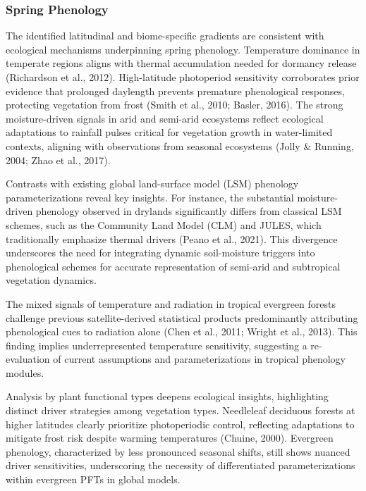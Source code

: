 \documentclass[pdflatex,sn-mathphys-num]{sn-jnl}%
\theoremstyle{thmstyleone}%
\theoremstyle{thmstyletwo}%
\theoremstyle{thmstylethree}%
\begin{document}
\subsubsection{Spring Phenology  }\label{subsubsec2}


The identified latitudinal and biome-specific gradients are consistent with ecological mechanisms underpinning spring phenology. Temperature dominance in temperate regions aligns with thermal accumulation needed for dormancy release (Richardson et al., 2012). High-latitude photoperiod sensitivity corroborates prior evidence that prolonged daylength prevents premature phenological responses, protecting vegetation from frost (Smith et al., 2010; Basler, 2016). The strong moisture-driven signals in arid and semi-arid ecosystems reflect ecological adaptations to rainfall pulses critical for vegetation growth in water-limited contexts, aligning with observations from seasonal ecosystems (Jolly \& Running, 2004; Zhao et al., 2017).

Contrasts with existing global land-surface model (LSM) phenology parameterizations reveal key insights. For instance, the substantial moisture-driven phenology observed in drylands significantly differs from classical LSM schemes, such as the Community Land Model (CLM) and JULES, which traditionally emphasize thermal drivers (Peano et al., 2021). This divergence underscores the need for integrating dynamic soil-moisture triggers into phenological schemes for accurate representation of semi-arid and subtropical vegetation dynamics.

The mixed signals of temperature and radiation in tropical evergreen forests challenge previous satellite-derived statistical products predominantly attributing phenological cues to radiation alone (Chen et al., 2011; Wright et al., 2013). This finding implies underrepresented temperature sensitivity, suggesting a re-evaluation of current assumptions and parameterizations in tropical phenology modules.

Analysis by plant functional types deepens ecological insights, highlighting distinct driver strategies among vegetation types. Needleleaf deciduous forests at higher latitudes clearly prioritize photoperiodic control, reflecting adaptations to mitigate frost risk despite warming temperatures (Chuine, 2000). Evergreen phenology, characterized by less pronounced seasonal shifts, still shows nuanced driver sensitivities, underscoring the necessity of differentiated parameterizations within evergreen PFTs in global models.
\end{document}

